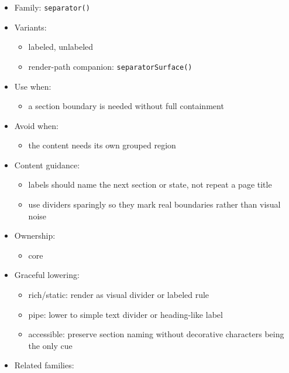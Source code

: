 \begin{itemize}
\tightlist
\item
  Family: \texttt{s\allowbreak{}e\allowbreak{}p\allowbreak{}a\allowbreak{}r\allowbreak{}a\allowbreak{}t\allowbreak{}o\allowbreak{}r\allowbreak{}(\allowbreak{})}
\item
  Variants:

  \begin{itemize}
  \tightlist
  \item
    labeled, unlabeled
  \item
    render-path companion: \texttt{s\allowbreak{}e\allowbreak{}p\allowbreak{}a\allowbreak{}r\allowbreak{}a\allowbreak{}t\allowbreak{}o\allowbreak{}r\allowbreak{}S\allowbreak{}u\allowbreak{}r\allowbreak{}f\allowbreak{}a\allowbreak{}c\allowbreak{}e\allowbreak{}(\allowbreak{})}
  \end{itemize}
\item
  Use when:

  \begin{itemize}
  \tightlist
  \item
    a section boundary is needed without full containment
  \end{itemize}
\item
  Avoid when:

  \begin{itemize}
  \tightlist
  \item
    the content needs its own grouped region
  \end{itemize}
\item
  Content guidance:

  \begin{itemize}
  \tightlist
  \item
    labels should name the next section or state, not repeat a page title
  \item
    use dividers sparingly so they mark real boundaries rather than visual noise
  \end{itemize}
\item
  Ownership:

  \begin{itemize}
  \tightlist
  \item
    core
  \end{itemize}
\item
  Graceful lowering:

  \begin{itemize}
  \tightlist
  \item
    rich/static: render as visual divider or labeled rule
  \item
    pipe: lower to simple text divider or heading-like label
  \item
    accessible: preserve section naming without decorative characters being the only cue
  \end{itemize}
\item
  Related families:


\end{itemize}
